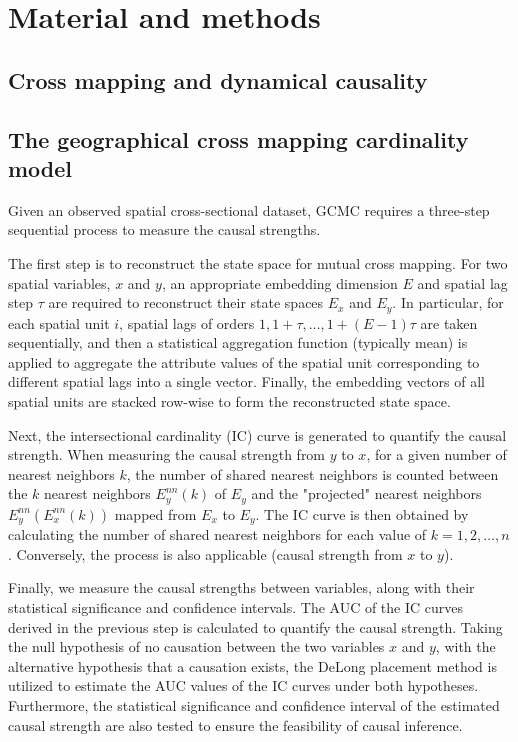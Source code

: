 \documentclass[authoryear,preprint,review,12pt]{elsarticle}
\begin{document}
\section{Material and methods}\label{sec2} 

\subsection{Cross mapping and dynamical causality}

\subsection{The geographical cross mapping cardinality model}

Given an observed spatial cross-sectional dataset, GCMC requires a three-step sequential process to measure the causal strengths.

The first step is to reconstruct the state space for mutual cross mapping. For two spatial variables, \(x\) and \(y\), an appropriate embedding dimension \(E\) and spatial lag step \(\tau\) are required to reconstruct their state spaces \(E_x\) and \(E_y\). In particular, for each spatial unit \(i\), spatial lags of orders \(1, 1+\tau, \dots, 1+(E-1)\tau\) are taken sequentially, and then a statistical aggregation function (typically mean) is applied to aggregate the attribute values of the spatial unit corresponding to different spatial lags into a single vector. Finally, the embedding vectors of all spatial units are stacked row-wise to form the reconstructed state space.

Next, the intersectional cardinality (IC) curve is generated
to quantify the causal strength. When measuring the causal strength from \(y\) to \(x\), for a given number of nearest neighbors \(k\), the number of shared nearest neighbors is counted between the \(k\) nearest neighbors \(E_y^{nn}(k)\) of \(E_y\) and the "projected" nearest neighbors \(E_y^{nn}(E_x^{nn}(k))\) mapped from \(E_x\) to \(E_y\). The IC curve is then obtained by calculating the number of shared nearest neighbors for each value of \(k = 1, 2, \dots, n\). Conversely, the process is also applicable (causal strength from \(x\) to \(y\)).

Finally, we measure the causal strengths between variables, along with their statistical significance and confidence intervals. The AUC of the IC curves derived in the previous step is calculated to quantify the causal strength. Taking the null hypothesis of no causation between the two variables \(x\) and \(y\), with the alternative hypothesis that a causation exists, the DeLong placement method is utilized to estimate the AUC values of the IC curves under both hypotheses. Furthermore, the statistical significance and confidence interval of the estimated causal strength are also tested to ensure the feasibility of causal inference.
\end{document}
